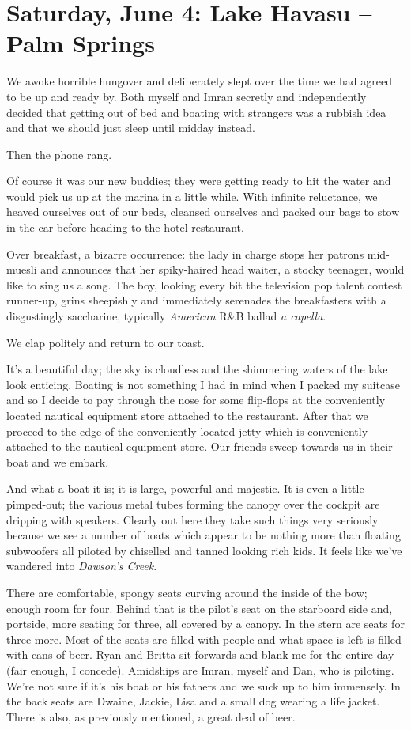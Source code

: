 \documentclass[a5paper,10pt,titlepage,draft]{book}
\begin{document}
\chapter[Lake Havasu -- Palm Springs]{Saturday, June 4:  Lake Havasu -- Palm Springs}
We awoke horrible hungover and deliberately slept over the time we had agreed to be up and ready by.  Both myself and Imran secretly and independently decided that getting out of bed and boating with strangers was a rubbish idea and that we should just sleep until midday instead.

Then the phone rang.

Of course it was our new buddies; they were getting ready to hit the water and would pick us up at the marina in a little while.  With infinite reluctance, we heaved ourselves out of our beds, cleansed ourselves and packed our bags to stow in the car before heading to the hotel restaurant.

Over breakfast, a bizarre occurrence:  the lady in charge stops her patrons mid-muesli and announces that her spiky-haired head waiter, a stocky teenager, would like to sing us a song.  The boy, looking every bit the television pop talent contest runner-up, grins sheepishly and immediately serenades the breakfasters with a disgustingly saccharine, typically \emph{American} R\&B ballad \emph{a capella}.

We clap politely and return to our toast.

It's a beautiful day; the sky is cloudless and the shimmering waters of the lake look enticing.  Boating is not something I had in mind when I packed my suitcase and so I decide to pay through the nose for some flip-flops at the conveniently located nautical equipment store attached to the restaurant.  After that we proceed to the edge of the conveniently located jetty which is conveniently attached to the nautical equipment store.  Our friends sweep towards us in their boat and we embark.

And what a boat it is; it is large, powerful and majestic.  It is even a little pimped-out; the various metal tubes forming the canopy over the cockpit are dripping with speakers.  Clearly out here they take such things very seriously because we see a number of boats which appear to be nothing more than floating subwoofers all piloted by chiselled and tanned looking rich kids.  It feels like we've wandered into \emph{Dawson's Creek}.

There are comfortable, spongy seats curving around the inside of the bow; enough room for four.  Behind that is the pilot's seat on the starboard side and, portside, more seating for three, all covered by a canopy.  In the stern are seats for three more.  Most of the seats are filled with people and what space is left is filled with cans of beer.  Ryan and Britta sit forwards and blank me for the entire day (fair enough, I concede).  Amidships are Imran, myself and Dan, who is piloting.  We're not sure if it's his boat or his fathers and we suck up to him immensely.  In the back seats are Dwaine, Jackie, Lisa and a small dog wearing a life jacket.  There is also, as previously mentioned, a great deal of beer.
\end{document}
